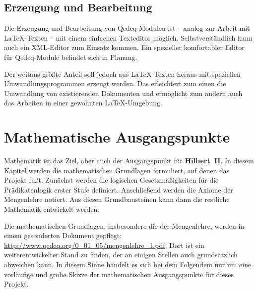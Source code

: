 \documentclass[a4paper,german,10pt,twoside]{book}
\begin{document}
{\section{Erzeugung und Bearbeitung}
Die Erzeugung und Bearbeitung von Qedeq-Modulen ist -- analog zur Arbeit mit \LaTeX{}-Texten -- mit
einem einfachen Texteditor m{\"o}glich. Selbstverst{\"a}ndlich kann auch ein XML-Editor zum Einsatz kommen.
Ein spezieller komfortabler Editor f{\"u}r Qedeq-Module befindet sich in Planung.
\par
Der weitaus gr{\"o}{\ss}te Anteil soll jedoch aus \LaTeX-Texten heraus mit speziellen Umwandlungsprogrammen
erzeugt werden. Das erleichtert zum einen die Umwandlung von existierenden Dokumenten und
erm{\"o}glicht zum andern auch das Arbeiten in einer gewohnten \LaTeX-Umgebung.


\chapter{Mathematische Ausgangspunkte} \label{Mathematische_Ausgangspunkte}

Mathematik ist das Ziel, aber auch der Ausgangspunkt f{\"u}r \textbf{Hilbert~II}. In diesem Kapitel
werden die mathematischen Grundlagen formuliert, auf denen das Projekt fu{\ss}t. Zun{\"a}chst werden die
logischen Gesetzm{\"a}{\ss}igkeiten f{\"u}r die Pr{\"a}dikatenlogik erster Stufe definiert. Anschlie{\ss}end werden die
Axiome der Mengenlehre notiert. Aus diesen Grundbausteinen kann dann die restliche Mathematik
entwickelt werden.
\par
Die mathematischen Grundlagen, insbesondere die der Mengenlehre, werden in einem gesonderten
Dokument gepflegt: \url{http://www.qedeq.org/0_01_05/mengenlehre_1.pdf}. Dort ist ein
weiterentwickelter Stand zu finden, der an einigen Stellen auch grunds{\"a}tzlich abweichen kann. In
diesem Sinne handelt es sich bei dem Folgendem nur um eine vorl{\"a}ufige und grobe Skizze der
mathematischen Ausgangspunkte f{\"u}r dieses Projekt.

}
\end{document}
